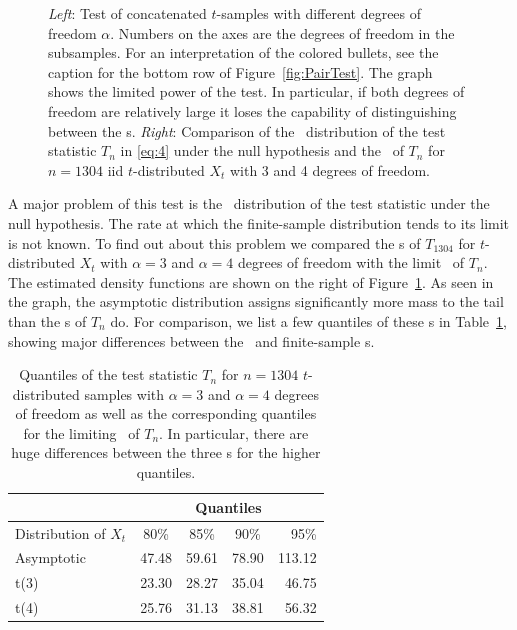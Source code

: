 \begin{figure}[htb!]
\begin{minipage}{0.5\linewidth}
  \end{minipage}
  \caption{
    {\em Left}: Test  of concatenated $t$-samples with different
    degrees of freedom $\alpha$. Numbers on the axes are the degrees of freedom
    in the subsamples. For an interpretation of the colored bullets,
    see the caption for the bottom row of Figure~\ref{fig:PairTest}. The graph shows the limited power
    of the test. In particular, if both degrees of freedom are
    relatively large it loses the capability of distinguishing between the \ds s.
    {\em Right}: Comparison of the \asy\ distribution of the test statistic
    $T_n$ in \eqref{eq:4} under the null hypothesis and the \ds\ of
    $T_n$ for $n=1304$ iid $t$-distributed $X_t$ with 3 and 4 degrees
    of freedom.
  }
  \label{fig:t_sim_pair}
\end{figure}

A major problem of this test is the \asy\ distribution of the test statistic under the
null hypothesis.  The rate at which the finite-sample distribution tends to its limit is not known.
To find out about this problem we compared the \ds s of $T_{1304}$ 
for $t$-distributed $X_t$ with  $\alpha=3$ and $\alpha=4$ degrees of freedom with
the limit \ds\ of $T_n$.
The estimated density functions are shown on the right of Figure~\ref{fig:t_sim_pair}.
As seen in the graph, the asymptotic distribution assigns
significantly more mass to the tail than the \ds s of $T_n$ do. For
comparison, we list a few quantiles of these \ds s in
Table~\ref{tab:HogaAsymptotic}, showing major differences between the
\asy\ and finite-sample \ds s.
\begin{table}[htb!]
  \centering
  \begin{tabular}{l|c|c|c|r}
    & \multicolumn{4}{c}{Quantiles} \\[2mm]
    \hline
    Distribution of $X_t$& 80\% & 85\% & 90\% & 95\% \\
    \hline
    Asymptotic & 47.48 & 59.61 & 78.90 & 113.12 \\
    t(3)  & 23.30 & 28.27 & 35.04 & 46.75 \\
    t(4)  & 25.76 & 31.13 & 38.81 & 56.32\\[2mm]
  \end{tabular}
  \caption{Quantiles of the test statistic $T_n$ for $n=1304$
    $t$-distributed samples with $\alpha=3$ and $\alpha=4$ 
degrees of freedom
    as well as the corresponding quantiles for the limiting \ds\ of
    $T_n$. In particular, there are huge differences between the three
    \ds s  for the higher quantiles. 
    }
  \label{tab:HogaAsymptotic}
\end{table}

